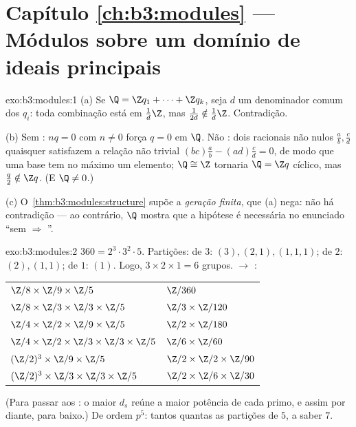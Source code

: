 \section*{Capítulo \ref{ch:b3:modules} --- Módulos sobre um domínio de ideais
principais}

\begin{solution}{exo:b3:modules:1}
(a) Se $\Q = \Z q_1 + \dots + \Z q_k$, seja $d$ um denominador comum dos $q_i$: toda combinação
está em $\frac1d\Z$, mas $\frac1{2d} \notin \frac1d\Z$. Contradição.

(b) Sem : $nq = 0$ com $n \neq 0$ força $q = 0$ em $\Q$. Não
: dois racionais não nulos $\frac ab, \frac cd$ quaisquer satisfazem a relação não
trivial $(bc)\frac ab - (ad)\frac cd =
0$, de modo que uma base tem no máximo um elemento; $\Q \cong \Z$
tornaria $\Q = \Z q$ cíclico, mas $\frac q2 \notin \Z q$. (E $\Q \neq
0$.)

(c) O~\cref{thm:b3:modules:structure} supõe a \emph{geração finita}, que (a) nega: não há
contradição --- ao contrário, $\Q$ mostra que a hipótese é necessária
no enunciado ``sem  $\Rightarrow$ ''.
\end{solution}

\begin{solution}{exo:b3:modules:2}
$360 = 2^3\cdot3^2\cdot5$. Partições: de $3$: $(3), (2,1),
(1,1,1)$; de $2$: $(2), (1,1)$; de $1$: $(1)$.
Logo, $3 \times 2
\times 1 = 6$ grupos.  $\to$ :
\begin{center}
\begin{tabular}{l l}
$\Z/8 \times \Z/9 \times \Z/5$ & $\Z/360$\\
$\Z/8 \times \Z/3 \times \Z/3 \times \Z/5$ & $\Z/3 \times
\Z/120$\\
$\Z/4 \times \Z/2 \times \Z/9 \times \Z/5$ & $\Z/2 \times
\Z/180$\\
$\Z/4 \times \Z/2 \times \Z/3 \times \Z/3 \times \Z/5$ & $\Z/6
\times \Z/60$\\
$(\Z/2)^3 \times \Z/9 \times \Z/5$ & $\Z/2 \times \Z/2 \times
\Z/90$\\
$(\Z/2)^3 \times \Z/3 \times \Z/3 \times \Z/5$ & $\Z/2 \times
\Z/6 \times \Z/30$
\end{tabular}
\end{center}
(Para passar aos : o maior $d_s$ reúne a maior
potência de cada primo, e assim por diante, para baixo.) De ordem
$p^5$: tantos quantas as partições de $5$, a saber $7$.
\end{solution}

